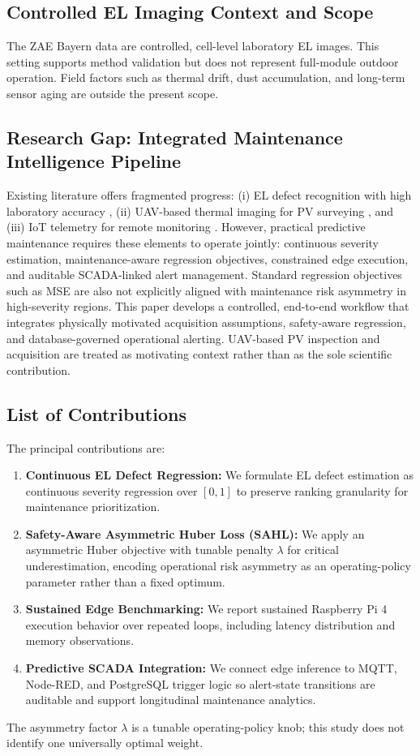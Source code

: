 \documentclass[journal]{IEEEtran}
\begin{document}
\subsection{Controlled EL Imaging Context and Scope}
The ZAE Bayern data are controlled, cell-level laboratory EL images. This setting supports method validation but does not represent full-module outdoor operation. Field factors such as thermal drift, dust accumulation, and long-term sensor aging are outside the present scope.

\subsection{Research Gap: Integrated Maintenance Intelligence Pipeline}
Existing literature offers fragmented progress: (i) EL defect recognition with high laboratory accuracy \cite{BuerhopLutz2018,Deitsch2019,Deitsch2021}, (ii) UAV-based thermal imaging for PV surveying \cite{Liao2022}, and (iii) IoT telemetry for remote monitoring \cite{Kunaifi2020,Kaswan2021}. However, practical predictive maintenance requires these elements to operate jointly: continuous severity estimation, maintenance-aware regression objectives, constrained edge execution, and auditable SCADA-linked alert management. Standard regression objectives such as MSE are also not explicitly aligned with maintenance risk asymmetry in high-severity regions. This paper develops a controlled, end-to-end workflow that integrates physically motivated acquisition assumptions, safety-aware regression, and database-governed operational alerting. UAV-based PV inspection and acquisition are treated as motivating context rather than as the sole scientific contribution.

\subsection{List of Contributions}
The principal contributions are:
\begin{enumerate}
\item \textbf{Continuous EL Defect Regression:} We formulate EL defect estimation as continuous severity regression over $[0,1]$ to preserve ranking granularity for maintenance prioritization.
\item \textbf{Safety-Aware Asymmetric Huber Loss (SAHL):} We apply an asymmetric Huber objective with tunable penalty $\lambda$ for critical underestimation, encoding operational risk asymmetry as an operating-policy parameter rather than a fixed optimum.
\item \textbf{Sustained Edge Benchmarking:} We report sustained Raspberry Pi 4 execution behavior over repeated loops, including latency distribution and memory observations.
\item \textbf{Predictive SCADA Integration:} We connect edge inference to MQTT, Node-RED, and PostgreSQL trigger logic so alert-state transitions are auditable and support longitudinal maintenance analytics.
\end{enumerate}
The asymmetry factor $\lambda$ is a tunable operating-policy knob; this study does not identify one universally optimal weight.
\end{document}
